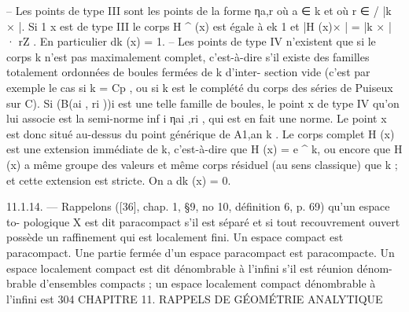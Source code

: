 \documentclass[
  10pt,
]{article}
\newenvironment{Shaded}{}{}
\newcommand{\NormalTok}[1]{#1}
\begin{document}
\begin{Shaded}
\begin{Highlighting}[]
\NormalTok{   – Les points de type III sont les points de la forme ηa,r où a ∈ k et où r ∈         / |k × |. Si}
\NormalTok{                                     1}
\NormalTok{x est de type III le corps H   \^{}  (x) est égale à ek 1 et |H (x)× | = |k × | · rZ . En particulier}
\NormalTok{dk (x) = 1.}
\NormalTok{   – Les points de type IV n’existent que si le corps k n’est pas maximalement complet,}
\NormalTok{c’est{-}à{-}dire s’il existe des familles totalement ordonnées de boules fermées de k d’inter{-}}
\NormalTok{section vide (c’est par exemple le cas si k = Cp , ou si k est le complété du corps des}
\NormalTok{séries de Puiseux sur C). Si (B(ai , ri ))i est une telle famille de boules, le point x de type}
\NormalTok{IV qu’on lui associe est la semi{-}norme inf i ηai ,ri , qui est en fait une norme. Le point x}
\NormalTok{est donc situé au{-}dessus du point générique de A1,an     k . Le corps complet H (x) est une}
\NormalTok{extension immédiate de k, c’est{-}à{-}dire que H (x) = e}
\NormalTok{                                                  \^{}         k, ou encore que H (x) a même}
\NormalTok{groupe des valeurs et même corps résiduel (au sens classique) que k ; et cette extension}
\NormalTok{est stricte. On a dk (x) = 0.}

\NormalTok{11.1.14. — Rappelons ([36], chap. 1, §9, no 10, définition 6, p. 69) qu’un espace to{-}}
\NormalTok{pologique X est dit paracompact s’il est séparé et si tout recouvrement ouvert possède}
\NormalTok{un raffinement qui est localement fini. Un espace compact est paracompact. Une partie}
\NormalTok{fermée d’un espace paracompact est paracompacte.}
\NormalTok{   Un espace localement compact est dit dénombrable à l’infini s’il est réunion dénom{-}}
\NormalTok{brable d’ensembles compacts ; un espace localement compact dénombrable à l’infini est}
\NormalTok{304                CHAPITRE 11. RAPPELS DE GÉOMÉTRIE ANALYTIQUE}


\end{Highlighting}
\end{Shaded}
\end{document}
